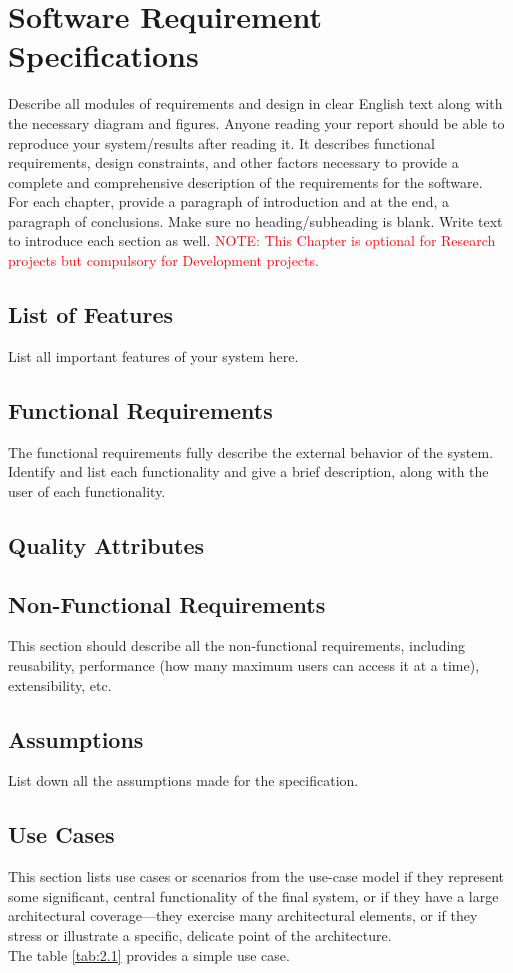 \documentclass{FastFyp}
\begin{document}
\chapter{Software Requirement Specifications}
Describe all modules of requirements and design in clear English text along with the necessary diagram and figures.  Anyone reading your report should be able to reproduce your system/results after reading it. It describes functional requirements, design constraints, and other factors necessary to provide a complete and comprehensive description of the requirements for the software.\\
For each chapter, provide a paragraph of introduction and at the end, a paragraph of conclusions. Make sure no heading/subheading is blank.  Write text to introduce each section as well. 
\textcolor{red}{NOTE: This Chapter is optional for Research projects but compulsory for Development projects.}
\section{List of Features}
List all important features of your system here.
\section{Functional Requirements}
The functional requirements fully describe the external behavior of the system. Identify and list each functionality and give a brief description, along with the user of each functionality.
\section{Quality Attributes}

\section{Non-Functional Requirements}
This section should describe all the non-functional requirements, including reusability, performance (how many maximum users can access it at a time), extensibility, etc.
\section{Assumptions}
List down all the assumptions made for the specification.
\section{Use Cases}
This section lists use cases or scenarios from the use-case model if they represent some significant, central functionality of the final system, or if they have a large architectural coverage—they exercise many architectural elements, or if they stress or illustrate a specific, delicate point of the architecture.\\
The table \ref{tab:2.1} provides a simple use case.
\end{document}
